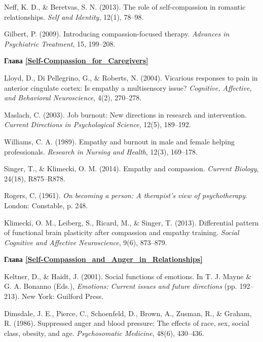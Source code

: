 \begin{thebibliography}{999}
	
	 Neff, K. D., \& Beretvas, S. N. (2013). The role of self-compassion in romantic relationships. \textit{Self and Identity}, 12(1), 78–98.
	
	 Gilbert, P. (2009). Introducing compassion-focused therapy. \textit{Advances in Psychiatric Treatment}, 15, 199–208.
	
	
	\vspace{3ex}
	\textbf{Глава \ref{Self-Compassion_for_Caregivers}}
	
	 Lloyd, D., Di Pellegrino, G., \& Roberts, N. (2004). Vicarious responses to pain in anterior cingulate cortex: Is empathy a multisensory issue? \textit{Cognitive, Affective, and Behavioral Neuroscience}, 4(2), 270–278.
	
	 Maslach, C. (2003). Job burnout: New directions in research and intervention. \textit{Current Directions in Psychological Science}, 12(5), 189–192.
	
	 Williams, C. A. (1989). Empathy and burnout in male and female helping professionals. \textit{Research in Nursing and Health}, 12(3), 169–178.
	
	 Singer, T., \& Klimecki, O. M. (2014). Empathy and compassion. \textit{Current Biology}, 24(18), R875–R878. 

	 Rogers, C. (1961). \textit{On becoming a person: A therapist’s view of psychotherapy}. London: Constable, p. 248.
	
	 Klimecki, O. M., Leiberg, S., Ricard, M., \& Singer, T. (2013). Differential pattern of functional brain plasticity after compassion and empathy training. \textit{Social Cognitive and Affective Neuroscience}, 9(6), 873–879.
	
	
	\vspace{3ex}
	\textbf{Глава \ref{Self-Compassion_and_Anger_in_Relationships}}
	
	 Keltner, D., \& Haidt, J. (2001). Social functions of emotions. In T. J. Mayne \& G. A. Bonanno (Eds.), \textit{Emotions: Current issues and future directions} (pp. 192–213). New York: Guilford Press.
	
	 Dimsdale, J. E., Pierce, C., Schoenfeld, D., Brown, A., Zusman, R., \& Graham, R. (1986). Suppressed anger and blood pressure: The effects of race, sex, social class, obesity, and age. \textit{Psychosomatic Medicine}, 48(6), 430–436.
	

\end{thebibliography}
